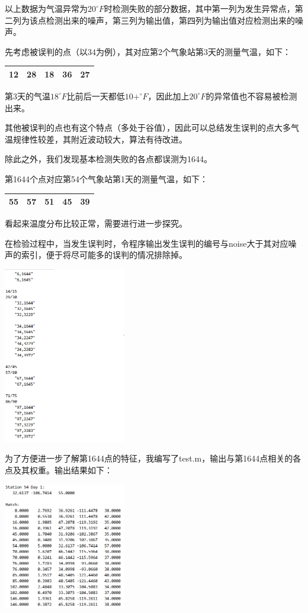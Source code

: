\documentclass[a4paper]{ctexart}
\begin{document}
以上数据为气温异常为$20^\circ F$时检测失败的部分数据，其中第一列为发生异常点，第二列为该点检测出来的噪声，第三列为输出值，第四列为输出值对应检测出来的噪声。

先考虑被误判的点（以34为例），其对应第2个气象站第3天的测量气温，如下：

\begin{tabular}{|c|c|c|c|c|}
    \hline
    12 & 28 & \bfseries{18} & 36 & 27 \\
    \hline
\end{tabular}

第3天的气温$18^\circ F$比前后一天都低$10+^\circ F$，因此加上$20^\circ F$的异常值也不容易被检测出来。

其他被误判的点也有这个特点（多处于谷值），因此可以总结发生误判的点大多气温规律性较差，其附近波动较大，算法有待改进。

除此之外，我们发现基本检测失败的各点都误测为1644。

第1644个点对应第54个气象站第1天的测量气温，如下：

\begin{tabular}{|c|c|c|c|c|}
    \hline
    \bfseries{55} & 57 & 51 & 45 & 39 \\
    \hline
\end{tabular}

看起来温度分布比较正常，需要进行进一步探究。

在检验过程中，当发生误判时，令程序输出发生误判的编号与noise大于其对应噪声的索引，便于将尽可能多的误判的情况排除掉。

\includegraphics[width=0.4\textwidth]{error.png}

为了方便进一步了解第1644点的特征，我编写了test.m，输出与第1644点相关的各点及其权重。输出结果如下：

\includegraphics[width=0.4\textwidth]{1644.png}
\end{document}
